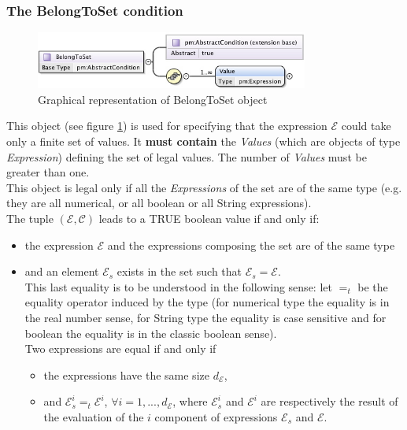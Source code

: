 \documentclass[a4paper,11pt] {ivoa}
\begin{document}
\subsubsection{The BelongToSet condition}\label{par-BelongToSet}
\begin{figure}[htbp]
\begin{center}
\includegraphics[width=0.8\textwidth]{pictures/BelongToSet.jpg} 
\caption{Graphical representation of BelongToSet object}
\label{Pic-BelongToSet}
\end{center}
\end{figure}
This object (see figure \ref{Pic-BelongToSet}) is used for specifying that the expression $\mathcal
E$ could take only a finite set of values.
It {\bf must contain} the {\it Values} (which are objects of type {\it Expression}) defining the set
of legal values. The number of {\it Values} must be greater than one.\\
This object is legal only if all the {\it Expressions} of the set are of the same type (e.g. they
are all numerical, or all boolean or all String expressions).\\
The tuple $(\mathcal E, \mathcal C)$ leads to a TRUE boolean value if and only if:
\begin{itemize}
\item the expression $\mathcal E$ and the expressions composing the set are of the same type
\item and an element $\mathcal E_s$ exists in the set such that $\mathcal E_s = \mathcal E$.\\
This last equality is to be understood in the following sense: let $=_t$ be the equality operator
induced by the type (for numerical type the equality is in the real number sense, for String type
the equality is case sensitive and for boolean the equality is in the classic boolean sense).\\
Two expressions are equal if and only if
\begin{itemize}
\item the expressions have the same size $d_{\mathcal E}$,
\item and $\mathcal E_s^i =_t \mathcal E^i$, $\forall i =1,...,d_{\mathcal E}$, where $\mathcal
E_s^i$ and $ \mathcal E^i$ are respectively the result of the evaluation of the
$i$ component of expressions $\mathcal E_s$ and $\mathcal E$. 
\end{itemize}
\end{itemize}
\end{document}
